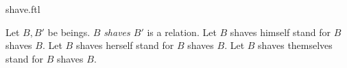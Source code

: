 \documentclass{stex}
\begin{document}
\begin{smodule}{shave.ftl}


  \begin{signature}[forthel,for=shave]
    Let $B,B'$ be beings.
    $B$ \emph{shaves $B'$} is a relation.
    Let $B$ shaves himself stand for $B$ shaves $B$.
    Let $B$ shaves herself stand for $B$ shaves $B$.
    Let $B$ shaves themselves stand for $B$ shaves $B$.
  \end{signature}
\end{smodule}
\end{document}
